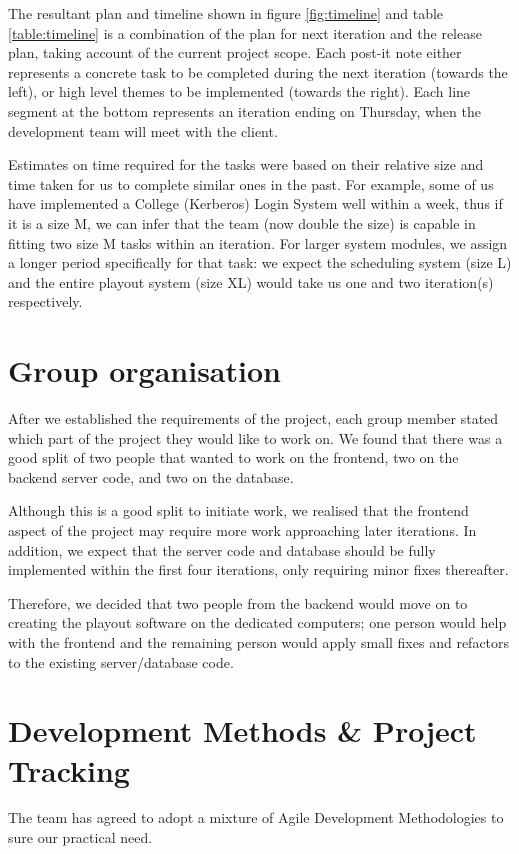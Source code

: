 \documentclass[a4paper]{article}
\begin{document}
The resultant plan and timeline shown in figure \ref{fig:timeline} and table
\ref{table:timeline} is a
combination of the plan for next iteration and the release plan, taking account
of the current project scope. Each post-it note either represents a 
concrete task to be completed during the next iteration (towards the left), or
high level themes to be implemented (towards the right). Each line segment at
the bottom represents an iteration ending on Thursday, when the development
team will meet with the client.


Estimates on time required for the tasks were based on their relative size and
time taken for us to complete similar ones in the past. For example, some of us
have implemented a College (Kerberos) Login System well within a week, thus if
it is a size M, we can infer that the team (now double the size) is capable in 
fitting two size M tasks within an iteration. For larger system modules, we
assign a longer period specifically for that task: we expect the scheduling
system (size L) and the entire playout system (size XL) would take us one and
two iteration(s) respectively.


\section{Group organisation} \label{sec:group}
After we established the requirements of the project, each group member stated
which part of the project they would like to work on. We found that there was a
good split of two people that wanted to work on the frontend, two on the backend
server code, and two on the database.

Although this is a good split to initiate work, we realised that the frontend 
aspect of the project may require more work approaching later iterations.
In addition, we  expect that the server code and database should be fully 
implemented within the first four iterations, only requiring minor fixes thereafter.

Therefore, we decided that two people from the backend would move on to creating
the playout software on the dedicated computers; one person would help with the
frontend and the remaining person would apply small fixes and refactors to the
existing server/database code. 


\section{Development Methods \& Project Tracking}
The team has agreed to adopt a mixture of Agile Development Methodologies to
sure our practical need.
\end{document}
